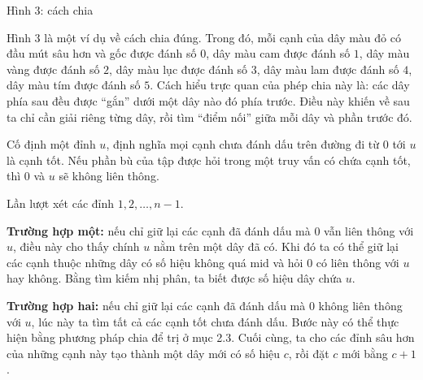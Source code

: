 \documentclass[11pt]{article}
\begin{document}
\begin{center}

Hình 3: cách chia
\end{center}

Hình 3 là một ví dụ về cách chia đúng. Trong đó, mỗi cạnh của dây màu đỏ có đầu
mút sâu hơn và gốc được đánh số \(0\), dây màu cam được đánh số \(1\), dây màu
vàng được đánh số \(2\), dây màu lục được đánh số \(3\), dây màu lam được đánh
số \(4\), dây màu tím được đánh số \(5\). Cách hiểu trực quan của phép chia này
là: các dây phía sau đều được ``gắn'' dưới một dây nào đó phía trước. Điều này
khiến về sau ta chỉ cần giải riêng từng dây, rồi tìm ``điểm nối'' giữa mỗi dây
và phần trước đó.

Cố định một đỉnh \(u\), định nghĩa mọi cạnh chưa đánh dấu trên đường đi từ
\(0\) tới \(u\) là cạnh tốt. Nếu phần bù của tập được hỏi trong một truy vấn có
chứa cạnh tốt, thì \(0\) và \(u\) sẽ không liên thông.

Lần lượt xét các đỉnh \(1,2,\ldots,n-1\).

\textbf{Trường hợp một:} nếu chỉ giữ lại các cạnh đã đánh dấu mà \(0\) vẫn liên
thông với \(u\), điều này cho thấy chính \(u\) nằm trên một dây đã có. Khi đó
ta có thể giữ lại các cạnh thuộc những dây có số hiệu không quá \(\mathrm{mid}\)
và hỏi \(0\) có liên thông với \(u\) hay không. Bằng tìm kiếm nhị phân, ta biết
được số hiệu dây chứa \(u\).

\textbf{Trường hợp hai:} nếu chỉ giữ lại các cạnh đã đánh dấu mà \(0\) không
liên thông với \(u\), lúc này ta tìm tất cả các cạnh tốt chưa đánh dấu. Bước
này có thể thực hiện bằng phương pháp chia để trị ở mục 2.3. Cuối cùng, ta cho
các đỉnh sâu hơn của những cạnh này tạo thành một dây mới có số hiệu \(c\), rồi
đặt \(c\) mới bằng \(c+1\).
\end{document}
